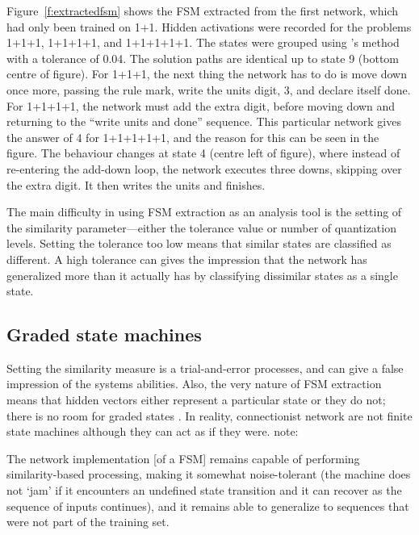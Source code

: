 \begin{fancyfigure}
\centerline{}
\caption{Finite state machine extracted from a network using
the \protect\citeauthor{maskforc} method (tolerance=0.04).  The circles
represent states, and the state numbers
next to them are for reference purposes.
Each state has a label associated with it (e.g., \protect\verb|DWN|
for state
13).
These are abbreviations of the output operations listed in
table~\protect\ref{f:ops}}
\label{f:extractedfsm}
\end{fancyfigure}

Figure~\ref{f:extractedfsm} shows the FSM extracted from the first network,
which had only been trained on 1+1. Hidden activations were recorded for
the problems 1+1+1, 1+1+1+1, and 1+1+1+1+1.  The states were grouped using
\citeauthor{maskforc}'s method with a tolerance of 0.04.  The solution
paths are
identical up to state 9 (bottom centre of figure).  For 1+1+1, the next
thing the network has to do is move down once more, passing the rule mark,
write the units digit, 3, and declare itself done.  For 1+1+1+1, the
network must add
the extra digit, before moving down and returning
to the ``write units and done''
sequence.  This particular network gives the
answer of 4 for 1+1+1+1+1, and the reason for this can be seen in the
figure. The behaviour changes at state 4 (centre left of figure), where
instead of re-entering the add-down loop, the network executes three
downs, skipping over the extra digit.  It then writes the units and
finishes.

The main difficulty in using FSM extraction as an analysis tool is the
setting of the similarity parameter---either the tolerance
value or number of
quantization levels.  Setting the tolerance too low means that similar
states are classified as different.  A high tolerance can gives the
impression that the network has generalized more than it actually has by
classifying dissimilar states as a single state.


\subsection{Graded state machines}

Setting the similarity measure is a trial-and-error processes, and can give
a false impression of the systems abilities.  Also, the very nature of FSM
extraction means that hidden vectors either represent a particular state or
they do not; there is no room for graded states \cite{servgrad}.  In
reality, connectionist network are not finite state machines although they
can act as if they were.  note:
\begin{ssquote}
The network implementation [of a FSM] remains capable of performing
sim\-il\-ar\-ity-based
processing, making it somewhat noise-tolerant (the machine
does not `jam' if it encounters an undefined state transition and it can
recover as the sequence of inputs continues), and it remains able to
generalize to sequences that were not part of the training set.
\end{ssquote}


